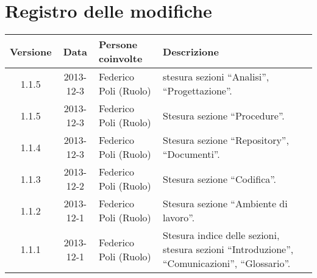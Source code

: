 \section*{Registro delle modifiche}

\small{
\begin{tabularx}{\textwidth}{|c|c|l|X|}
 \hline \textbf{Versione} & \textbf{Data} & \textbf{Persone coinvolte} & \textbf{Descrizione} \\

 
 \hline 1.1.5 & 2013-12-3 & Federico Poli (Ruolo) &
 stesura sezioni ``Analisi'', ``Progettazione''. \\

 \hline 1.1.5 & 2013-12-3 & Federico Poli (Ruolo) &
 Stesura sezione ``Procedure''. \\

 \hline 1.1.4 & 2013-12-3 & Federico Poli (Ruolo) &
 Stesura sezione ``Repository'', ``Documenti''. \\

 \hline 1.1.3 & 2013-12-2 & Federico Poli (Ruolo) &
 Stesura sezione ``Codifica''. \\

 \hline 1.1.2 & 2013-12-1 & Federico Poli (Ruolo) &
 Stesura sezione ``Ambiente di lavoro''. \\

 \hline 1.1.1 & 2013-12-1 & Federico Poli (Ruolo) &
 Stesura indice delle sezioni, stesura sezioni ``Introduzione'', ``Comunicazioni'', ``Glossario''. \\

 \hline
\end{tabularx}
}
